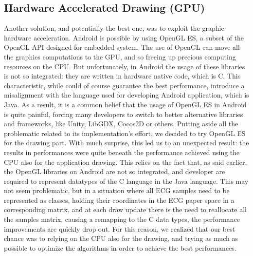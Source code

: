 \subsection{Hardware Accelerated Drawing (GPU)}
Another solution, and potentially the best one, was to exploit the graphic hardware acceleration. Android is possible by using OpenGL ES, a subset of the OpenGL API designed for embedded system. The use of OpenGL can move all the graphics computations to the GPU, and so freeing up precious computing resources on the CPU. But unfortunately, in Android the usage of these libraries is not so integrated: they are written in hardware native code, which is C. This characteristic, while could of course guarantee the best performance\cite{ref20}, introduce a misalignment with the language used for developing Android application, which is Java. As a result, it is a common belief that the usage of OpenGL ES in Android is quite painful, forcing many developers to switch to better alternative libraries and frameworks, like Unity, LibGDX, Cocos2D or others. Putting aside all the problematic related to its implementation's effort, we decided to try OpenGL ES for the drawing part. With much surprise, this led us to an unexpected result: the results in performances were quite beneath the performance achieved using the CPU also for the application drawing. This relies on the fact that, as said earlier, the OpenGL libraries on Android are not so integrated, and developer are required to represent datatypes of the C language in the Java language. This may not seem problematic, but in a situation where all ECG samples need to be represented as classes, holding their coordinates in the ECG paper space in a corresponding matrix, and at each draw update there is the need to reallocate all the samples matrix, causing a remapping to the C data types, the performance improvements  are quickly drop out. For this reason, we realized that our best chance was to relying on the CPU also for the drawing, and trying as much as possible to optimize the algorithms in order to achieve the best performances.


